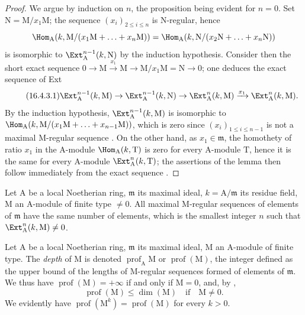 \begin{proof}
We argue by induction on $n$, the proposition being evident for $n=0$.
Set $\mathrm{N}=\mathrm{M}/x_1\mathrm{M}$; the sequence $(x_i)_{2\leq i\leq n}$ is $\mathrm{N}$-regular, hence
\[
  \Hom_\mathrm{A}(k,\mathrm{M}/(x_1\mathrm{M}+\ldots+x_n\mathrm{M}))=\Hom_\mathrm{A}(k,\mathrm{N}/(x_2\mathrm{N}+\ldots+x_n\mathrm{N}))
\]
is isomorphic to $\Ext^{n-1}_\mathrm{A}(k,\mathrm{N})$ by the induction hypothesis.
Consider then the short exact sequence $0\to\mathrm{M}\xrightarrow{x_1}\mathrm{M}\to\mathrm{M}/x_1\mathrm{M}=\mathrm{N}\to 0$; one deduces the exact sequence of Ext
\begin{equation}
\label{0.16.4.3.1}
\tag{16.4.3.1}
  \Ext^{n-1}_\mathrm{A}(k,\mathrm{M})\to\Ext^{n-1}_\mathrm{A}(k,\mathrm{N})\to\Ext^n_\mathrm{A}(k,\mathrm{M})\xrightarrow{x_1}\Ext^n_\mathrm{A}(k,\mathrm{M}).
\end{equation}
By the induction hypothesis, $\Ext^{n-1}_\mathrm{A}(k,\mathrm{M})$ is isomorphic to $\Hom_\mathrm{A}(k,\mathrm{M}/(x_1\mathrm{M}+\ldots+x_{n-1}\mathrm{M}))$, which is zero since $(x_i)_{1\leq i\leq n-1}$ is not a maximal $\mathrm{M}$-regular sequence .
On the other hand, as $x_1\in\mathfrak{m}$, the homothety of ratio $x_1$ in the $\mathrm{A}$-module $\Hom_\mathrm{A}(k,\mathrm{T})$ is zero for every $\mathrm{A}$-module $\mathrm{T}$, hence it is the same for every $\mathrm{A}$-module $\Ext^n_\mathrm{A}(k,\mathrm{T})$; the assertions of the lemma then follow immediately from the exact sequence .
\end{proof}

\begin{corollary}[16.4.4]
\label{0.16.4.4}
Let $\mathrm{A}$ be a local Noetherian ring, $\mathfrak{m}$ its maximal ideal, $k=\mathrm{A}/\mathfrak{m}$ its residue field, $\mathrm{M}$ an $\mathrm{A}$-module of finite type $\neq 0$.
All maximal $\mathrm{M}$-regular sequences of elements of $\mathfrak{m}$ have the same number of elements, which is the smallest integer $n$ such that $\Ext^n_\mathrm{A}(k,\mathrm{M})\neq 0$.
\end{corollary}

\begin{definition}[16.4.5]
\label{0.16.4.5}
Let $\mathrm{A}$ be a local Noetherian ring, $\mathfrak{m}$ its maximal ideal, $\mathrm{M}$ an $\mathrm{A}$-module of finite type.
The \emph{depth} of $\mathrm{M}$ is denoted $\operatorname{prof}_\mathrm{A}\mathrm{M}$ or $\operatorname{prof}(\mathrm{M})$, the integer defined as the upper bound of the lengths of $\mathrm{M}$-regular sequences formed of elements of $\mathfrak{m}$.
We thus have $\operatorname{prof}(\mathrm{M})=+\infty$ if and only if $\mathrm{M}=0$, and, by ,
\begin{equation}
\label{0.16.4.5.1}
\tag{16.4.5.1}
  \operatorname{prof}(\mathrm{M})\leq\dim(\mathrm{M})\quad\text{if}\quad\mathrm{M}\neq 0.
\end{equation}
We evidently have $\operatorname{prof}(\mathrm{M}^k)=\operatorname{prof}(\mathrm{M})$ for every $k>0$.
\end{definition}

